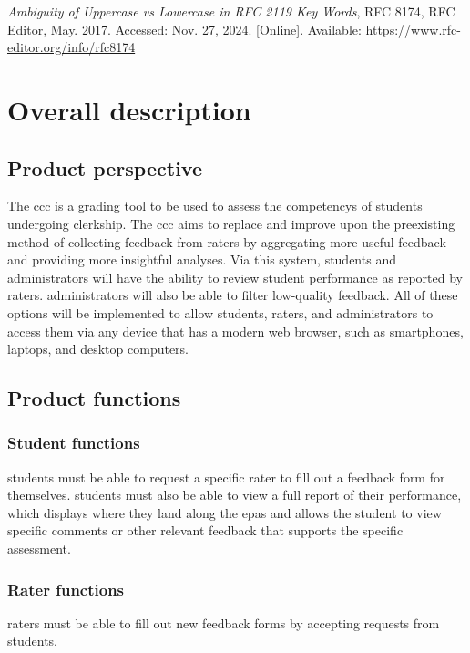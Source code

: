 \documentclass[letterpaper,article,oneside]{memoir}
\begin{document}
\textit{Ambiguity of Uppercase vs Lowercase in RFC 2119 Key Words}, RFC 8174, RFC Editor, May. 2017. Accessed: Nov. 27, 2024. [Online]. Available: \url{https://www.rfc-editor.org/info/rfc8174}

\chapter{Overall description}

\section{Product perspective}

The \gls{ccc} is a grading tool to be used to assess the \glspl{competency} of \glspl{student} undergoing \gls{clerkship}.
The \gls{ccc} aims to replace and improve upon the preexisting method of collecting feedback from \glspl{rater} by aggregating more useful feedback and providing more insightful analyses.
Via this system, \glspl{student} and \glspl{administrator} will have the ability to review student performance as reported by \glspl{rater}.
\Glspl{administrator} will also be able to filter low-quality feedback.
All of these options will be implemented to allow \glspl{student}, \glspl{rater}, and \glspl{administrator} to access them via any device that has a modern web browser, such as smartphones, laptops, and desktop computers.

\section{Product functions}

\subsection{Student functions}

\Glspl{student} must be able to request a specific \gls{rater} to fill out a \gls{feedback form} for themselves.
\Glspl{student} must also be able to view a \gls{full report} of their performance, which displays where they land along the \glspl{epa} and allows the \gls{student} to view specific comments or other relevant feedback that supports the specific assessment.

\subsection{Rater functions}

\Glspl{rater} must be able to fill out new \glspl{feedback form} by accepting requests from \glspl{student}.
\end{document}
